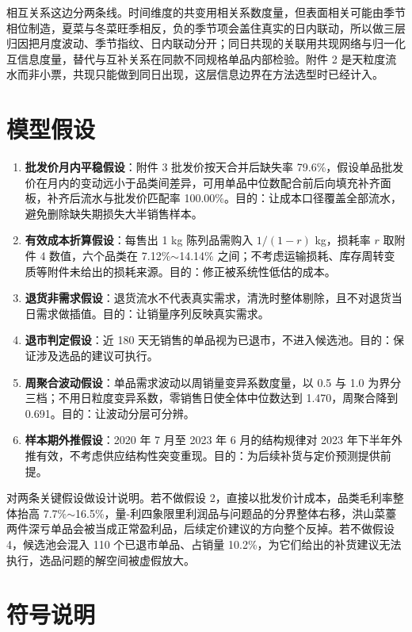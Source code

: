 \documentclass[zihao=-4,a4paper]{ctexart}
\begin{document}
相互关系这边分两条线。时间维度的共变用相关系数度量，但表面相关可能由季节相位制造，夏菜与冬菜旺季相反，负的季节项会盖住真实的日内联动，所以做三层归因把月度波动、季节指纹、日内联动分开；同日共现的关联用共现网络与归一化互信息度量，替代与互补关系在同款不同规格单品内部检验。附件 2 是天粒度流水而非小票，共现只能做到同日出现，这层信息边界在方法选型时已经计入。


\section{模型假设}

\begin{enumerate}
  \item \textbf{批发价月内平稳假设}：附件 3 批发价按天合并后缺失率 79.6\%，假设单品批发价在月内的变动远小于品类间差异，可用单品中位数配合前后向填充补齐面板，补齐后流水与批发价匹配率 100.00\%。目的：让成本口径覆盖全部流水，避免删除缺失期损失大半销售样本。
  \item \textbf{有效成本折算假设}：每售出 1 kg 陈列品需购入 $1/(1-r)$ kg，损耗率 $r$ 取附件 4 数值，六个品类在 7.12\%$\sim$14.14\% 之间；不考虑运输损耗、库存周转变质等附件未给出的损耗来源。目的：修正被系统性低估的成本。
  \item \textbf{退货非需求假设}：退货流水不代表真实需求，清洗时整体剔除，且不对退货当日需求做插值。目的：让销量序列反映真实需求。
  \item \textbf{退市判定假设}：近 180 天无销售的单品视为已退市，不进入候选池。目的：保证涉及选品的建议可执行。
  \item \textbf{周聚合波动假设}：单品需求波动以周销量变异系数度量，以 0.5 与 1.0 为界分三档；不用日粒度变异系数，零销售日使全体中位数达到 1.470，周聚合降到 0.691。目的：让波动分层可分辨。
  \item \textbf{样本期外推假设}：2020 年 7 月至 2023 年 6 月的结构规律对 2023 年下半年外推有效，不考虑供应结构性突变重现。目的：为后续补货与定价预测提供前提。
\end{enumerate}

对两条关键假设做设计说明。若不做假设 2，直接以批发价计成本，品类毛利率整体抬高 7.7\%$\sim$16.5\%，量-利四象限里利润品与问题品的分界整体右移，洪山菜薹两件深亏单品会被当成正常盈利品，后续定价建议的方向整个反掉。若不做假设 4，候选池会混入 110 个已退市单品、占销量 10.2\%，为它们给出的补货建议无法执行，选品问题的解空间被虚假放大。

\section{符号说明}
\end{document}
